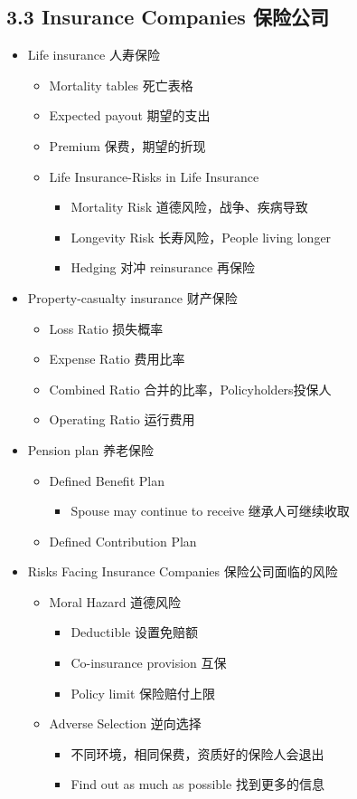 \documentclass[a4paper,6pt,twoside,openany]{article}
\begin{document}
\subsection*{3.3 Insurance Companies 保险公司}
\begin{itemize}
\item Life insurance 人寿保险
  \begin{itemize}
  \item Mortality tables 死亡表格
  \item Expected payout 期望的支出
  \item Premium 保费，期望的折现
  \item Life Insurance-Risks in Life Insurance
    \begin{itemize}
    \item Mortality Risk 道德风险，战争、疾病导致
    \item Longevity Risk 长寿风险，People living longer
    \item Hedging 对冲 reinsurance 再保险
    \end{itemize}
  \end{itemize}
\item Property-casualty insurance 财产保险
  \begin{itemize}
  \item Loss Ratio 损失概率
  \item Expense Ratio 费用比率
  \item Combined Ratio 合并的比率，Policyholders投保人
  \item Operating Ratio 运行费用
  \end{itemize}
\item Pension plan 养老保险
  \begin{itemize}
  \item Defined Benefit Plan
    \begin{itemize}
    \item Spouse may continue to receive 继承人可继续收取
    \end{itemize}
  \item Defined Contribution Plan
  \end{itemize}
\item Risks Facing Insurance Companies 保险公司面临的风险
  \begin{itemize}
  \item Moral Hazard 道德风险
    \begin{itemize}
    \item Deductible 设置免赔额
    \item Co-insurance provision 互保 
      \item Policy limit 保险赔付上限
    \end{itemize}
  \item Adverse Selection 逆向选择
    \begin{itemize}
    \item 不同环境，相同保费，资质好的保险人会退出
    \item Find out as much as possible 找到更多的信息
    \end{itemize}
  \end{itemize}
\end{itemize}
\end{document}
